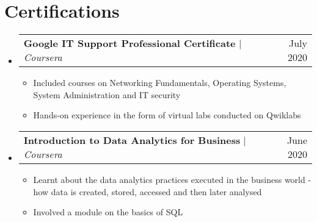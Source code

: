 \documentclass[a4paper,11pt]{article}
\makeatletter
\newcommand{\resumeItem}[1]{
  \item\small{
    {#1 \vspace{-2pt}}
  }
}
\newcommand{\resumeProjectHeading}[2]{
    \item
    \begin{tabular*}{0.97\textwidth}{l@{\extracolsep{\fill}}r}
      \small#1 & #2 \\
    \end{tabular*}\vspace{-7pt}
}
\newcommand{\resumeSubHeadingListStart}{\begin{itemize}[leftmargin=0.15in, label={}]}
\newcommand{\resumeSubHeadingListEnd}{\end{itemize}}
\newcommand{\resumeItemListStart}{\begin{itemize}}
\newcommand{\resumeItemListEnd}{\end{itemize}\vspace{-5pt}}
\makeatother
\begin{document}
\section{Certifications}
    \resumeSubHeadingListStart
      \resumeProjectHeading
          {\textbf{Google IT Support Professional Certificate} $|$ \emph{Coursera}}{July 2020}
          \resumeItemListStart
            \resumeItem{Included courses on Networking Fundamentals, Operating Systems, System Administration and IT security}
            \resumeItem{Hands-on experience in the form of virtual labs conducted on Qwiklabs}
          \resumeItemListEnd
      \resumeProjectHeading
          {\textbf{Introduction to Data Analytics for Business} $|$ \emph{Coursera}}{June 2020}
          \resumeItemListStart
            \resumeItem{Learnt about the data analytics practices executed in the business world - how data is created, stored, accessed and then later analysed}
            \resumeItem{Involved a module on the basics of SQL}
          \resumeItemListEnd
    \resumeSubHeadingListEnd
\end{document}
